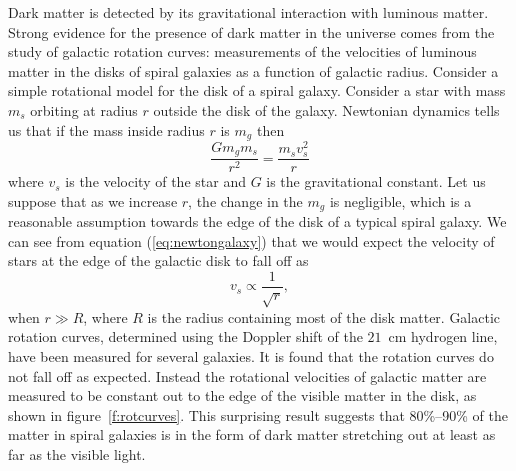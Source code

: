 Dark matter is detected by its gravitational interaction with luminous matter.
Strong evidence for the presence of dark matter in the universe comes from the
study of galactic rotation curves: measurements of the velocities of luminous
matter in the disks of spiral galaxies as a function of galactic radius.  
Consider a simple rotational model for the disk of a spiral galaxy.
Consider a star with mass $m_s$ orbiting at radius $r$ outside the disk of
the galaxy. Newtonian dynamics tells us that if the mass inside radius
$r$ is $m_g$ then
\begin{equation}
\frac{Gm_g m_s}{r^2} = \frac{m_s v_s^2}{r}
\label{eq:newtongalaxy}
\end{equation}
where $v_s$ is the velocity of the star and $G$ is the gravitational constant. 
Let us suppose that as we increase $r$, the change in the $m_g$ is negligible,
which is a reasonable assumption towards the edge of the disk of a typical
spiral galaxy.  We can see from equation (\ref{eq:newtongalaxy}) that we would
expect the velocity of stars at the edge of the galactic disk to fall off as 
\begin{equation}
v_s \propto \frac{1}{\sqrt{r}},
\end{equation}
when $r \gg R$, where $R$ is the radius containing most of the disk matter.
Galactic rotation curves, determined using the Doppler shift of the $21$~cm
hydrogen line, have been measured for several galaxies\cite{Sancisi:1987}. It
is found that the rotation curves do not fall off as expected. Instead the
rotational velocities of galactic matter are measured to be constant out to
the edge of the visible matter in the disk, as shown in
figure~\ref{f:rotcurves}.  This surprising result suggests that 
80\%--90\% of the matter in spiral galaxies is in the form of dark matter
stretching out at least as far as the visible light.

